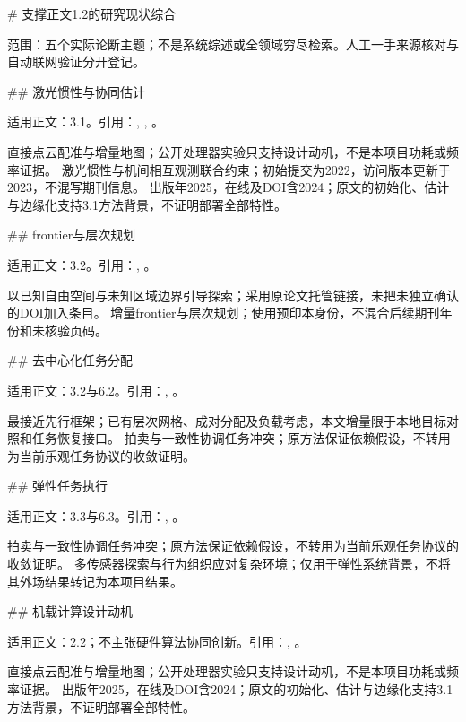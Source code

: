 # 支撑正文1.2的研究现状综合

范围：五个实际论断主题；不是系统综述或全领域穷尽检索。人工一手来源核对与自动联网验证分开登记。

## 激光惯性与协同估计

适用正文：3.1。引用：\cite{fastlio2021}, \cite{swarmlio2022}, \cite{swarmlio2025}。

直接点云配准与增量地图；公开处理器实验只支持设计动机，不是本项目功耗或频率证据。 激光惯性与机间相互观测联合约束；初始提交为2022，访问版本更新于2023，不混写期刊信息。 出版年2025，在线及DOI含2024；原文的初始化、估计与边缘化支持3.1方法背景，不证明部署全部特性。

## frontier与层次规划

适用正文：3.2。引用：\cite{yamauchi1997}, \cite{fuel2020}。

以已知自由空间与未知区域边界引导探索；采用原论文托管链接，未把未独立确认的DOI加入条目。 增量frontier与层次规划；使用预印本身份，不混合后续期刊年份和未核验页码。

## 去中心化任务分配

适用正文：3.2与6.2。引用：\cite{racer2023}, \cite{cbba2009}。

最接近先行框架；已有层次网格、成对分配及负载考虑，本文增量限于本地目标对照和任务恢复接口。 拍卖与一致性协调任务冲突；原方法保证依赖假设，不转用为当前乐观任务协议的收敛证明。

## 弹性任务执行

适用正文：3.3与6.3。引用：\cite{best2022}, \cite{cbba2009}。

拍卖与一致性协调任务冲突；原方法保证依赖假设，不转用为当前乐观任务协议的收敛证明。 多传感器探索与行为组织应对复杂环境；仅用于弹性系统背景，不将其外场结果转记为本项目结果。

## 机载计算设计动机

适用正文：2.2；不主张硬件算法协同创新。引用：\cite{fastlio2021}, \cite{swarmlio2025}。

直接点云配准与增量地图；公开处理器实验只支持设计动机，不是本项目功耗或频率证据。 出版年2025，在线及DOI含2024；原文的初始化、估计与边缘化支持3.1方法背景，不证明部署全部特性。

